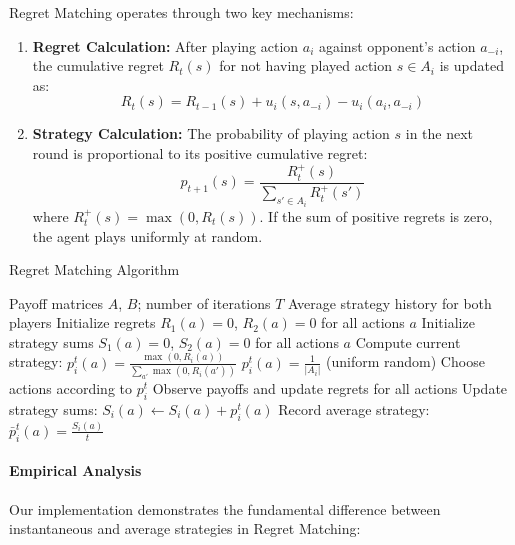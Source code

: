 \documentclass[conference]{IEEEtran}
\begin{document}
Regret Matching operates through two key mechanisms:

\begin{enumerate}
    \item \textbf{Regret Calculation:} After playing action $a_i$ against opponent's action $a_{-i}$, the cumulative regret $R_t(s)$ for not having played action $s \in A_i$ is updated as:
    \begin{equation}
    R_t(s) = R_{t-1}(s) + u_i(s, a_{-i}) - u_i(a_i, a_{-i})
    \end{equation}
    
    \item \textbf{Strategy Calculation:} The probability of playing action $s$ in the next round is proportional to its positive cumulative regret:
    \begin{equation}
    p_{t+1}(s) = \frac{R_t^+(s)}{\sum_{s' \in A_i} R_t^+(s')}
    \end{equation}
    where $R_t^+(s) = \max(0, R_t(s))$. If the sum of positive regrets is zero, the agent plays uniformly at random.
\end{enumerate}

\begin{algorithm}[h!]
\caption{Regret Matching Algorithm}
\begin{algorithmic}[1]
\REQUIRE Payoff matrices $A$, $B$; number of iterations $T$
\ENSURE Average strategy history for both players
\STATE Initialize regrets $R_1(a) = 0$, $R_2(a) = 0$ for all actions $a$
\STATE Initialize strategy sums $S_1(a) = 0$, $S_2(a) = 0$ for all actions $a$
    \STATE Compute current strategy: $p_i^t(a) = \frac{\max(0, R_i(a))}{\sum_{a'} \max(0, R_i(a'))}$
        \STATE $p_i^t(a) = \frac{1}{|A_i|}$ (uniform random)
    \ENDIF
    \STATE Choose actions according to $p_i^t$
    \STATE Observe payoffs and update regrets for all actions
    \STATE Update strategy sums: $S_i(a) \leftarrow S_i(a) + p_i^t(a)$
    \STATE Record average strategy: $\bar{p}_i^t(a) = \frac{S_i(a)}{t}$
\ENDFOR
\end{algorithmic}
\label{alg:regret_matching}
\end{algorithm}

\paragraph{Empirical Analysis}

Our implementation demonstrates the fundamental difference between instantaneous and average strategies in Regret Matching:
\end{document}
